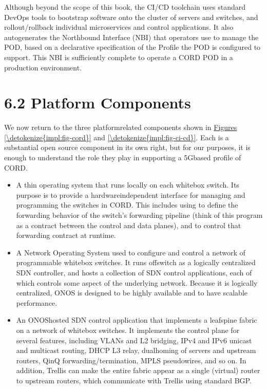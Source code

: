 \documentclass[a4paper,11pt,english]{sphinxmanual}
\begin{document}
\sphinxAtStartPar
Although beyond the scope of this book, the CI/CD toolchain uses
standard DevOps tools to bootstrap software onto the cluster of servers
and switches, and rollout/rollback individual microservices and control
applications. It also auto\sphinxhyphen{}generates the Northbound Interface (NBI) that
operators use to manage the POD, based on a declarative specification of
the Profile the POD is configured to support. This NBI is sufficiently
complete to operate a CORD POD in a production environment.


\section{6.2 Platform Components}
\label{\detokenize{impl:platform-components}}
\sphinxAtStartPar
We now return to the three platform\sphinxhyphen{}related components shown in
\hyperref[\detokenize{impl:fig-cord}]{Figures \ref{\detokenize{impl:fig-cord}}} and \hyperref[\detokenize{impl:fig-ci-cd}]{\ref{\detokenize{impl:fig-ci-cd}}}. Each is a substantial open source component in its own
right, but for our purposes, it is enough to understand the role they
play in supporting a 5G\sphinxhyphen{}based profile of CORD.
\begin{itemize}
\item {} 
\sphinxAtStartPar
{} A thin operating system that runs locally on each
white\sphinxhyphen{}box switch. Its purpose is to provide a hardware\sphinxhyphen{}independent
interface for managing and programming the switches in CORD. This
includes using  to define the forwarding behavior of the switch’s
forwarding pipeline (think of this program as a contract between the
control and data planes), and  to control that forwarding
contract at runtime.

\item {} 
\sphinxAtStartPar
{} A Network Operating System used to configure and control a
network of programmable white\sphinxhyphen{}box switches. It runs off\sphinxhyphen{}switch as a
logically centralized SDN controller, and hosts a collection of SDN
control applications, each of which controls some aspect of the
underlying network. Because it is logically centralized, ONOS is
designed to be highly available and to have scalable performance.

\item {} 
\sphinxAtStartPar
{} An ONOS\sphinxhyphen{}hosted SDN control application that implements a
leaf\sphinxhyphen{}spine fabric on a network of white\sphinxhyphen{}box switches. It implements
the control plane for several features, including VLANs and L2
bridging, IPv4 and IPv6 unicast and multicast routing, DHCP L3 relay,
dual\sphinxhyphen{}homing of servers and upstream routers, QinQ
forwarding/termination, MPLS pseudowires, and so on. In addition,
Trellis can make the entire fabric appear as a single (virtual)
router to upstream routers, which communicate with Trellis using
standard BGP.

\end{itemize}
\end{document}
